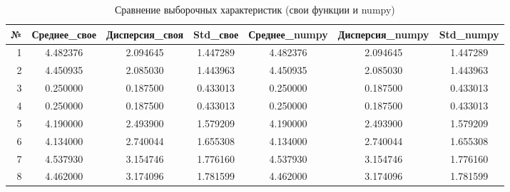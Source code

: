 \begin{table}[H]
\centering
\caption{Сравнение выборочных характеристик (свои функции и numpy)}
\small
\begin{tabular}{rcccccc}
\toprule
№ & Среднее\_свое & Дисперсия\_своя & Std\_свое & Среднее\_numpy & Дисперсия\_numpy & Std\_numpy \\
\midrule
1 & 4.482376 & 2.094645 & 1.447289 & 4.482376 & 2.094645 & 1.447289 \\
2 & 4.450935 & 2.085030 & 1.443963 & 4.450935 & 2.085030 & 1.443963 \\
3 & 0.250000 & 0.187500 & 0.433013 & 0.250000 & 0.187500 & 0.433013 \\
4 & 0.250000 & 0.187500 & 0.433013 & 0.250000 & 0.187500 & 0.433013 \\
5 & 4.190000 & 2.493900 & 1.579209 & 4.190000 & 2.493900 & 1.579209 \\
6 & 4.134000 & 2.740044 & 1.655308 & 4.134000 & 2.740044 & 1.655308 \\
7 & 4.537930 & 3.154746 & 1.776160 & 4.537930 & 3.154746 & 1.776160 \\
8 & 4.462000 & 3.174096 & 1.781599 & 4.462000 & 3.174096 & 1.781599 \\
\bottomrule
\end{tabular}
\end{table}
